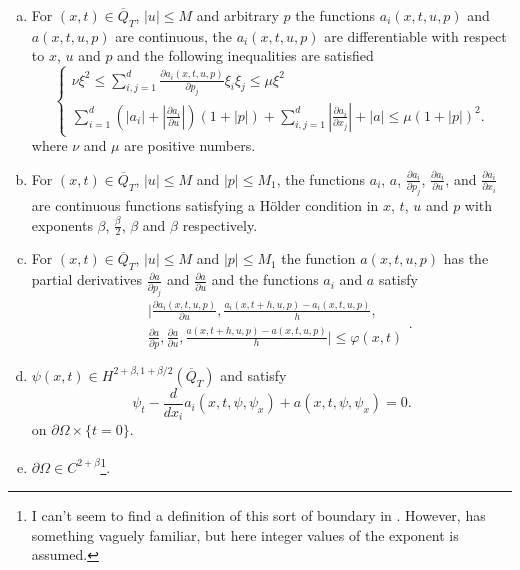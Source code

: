 \documentclass[11pt, a4paper]{article}
\begin{document}
\begin{appendices}
\begin{theorem}
\begin{enumerate}[a)]
	\item For $(x,t) \in \overline{Q}_T$, $|u| \leq M$ and arbitrary $p$ the functions $a_i(x,t,u,p)$ and $a(x,t,u,p)$ are continuous, the $a_i(x,t,u,p)$ are differentiable with respect to $x$, $u$ and $p$ and the following inequalities are satisfied
	\begin{equation}
	\label{exist_cond3}
		\begin{cases}
			\nu\xi^2 \leq \sum_{i,j=1}^d\frac{\partial a_i(x,t,u,p)}{\partial p_j}\xi_i \xi_j \leq \mu \xi^2 \\
			\sum_{i=1}^d \left(|a_i| + |\frac{\partial a_i}{\partial u}|\right)(1+|p|) + \sum_{i,j=1}^d |\frac{\partial a_i}{\partial x_j}| + |a| \leq \mu (1 + |p|)^2. 		
		\end{cases}
	\end{equation}
	where $\nu$ and $\mu$ are positive numbers.
	
	\item For $(x,t) \in \overline{Q}_T$, $|u| \leq M$ and $|p| \leq M_1$, the functions $a_i$, $a$, $\frac{\partial a_i}{\partial p_j}$, $\frac{\partial a_i}{\partial u}$, and $\frac{\partial a_i}{\partial x_i}$ are continuous functions satisfying a Hölder condition in $x$, $t$, $u$ and $p$ with exponents $\beta$, $\frac{\beta}{2}$, $\beta$ and $\beta$ respectively.
	
	\item For $(x,t) \in \overline{Q}_T$, $|u| \leq M$ and $|p| \leq M_1$ the function $a(x,t,u,p)$ has the partial derivatives $\frac{\partial a}{\partial p_j}$ and $\frac{\partial a}{\partial u}$ and the functions $a_i$ and $a$ satisfy
	\begin{equation}
	\label{exist_cond4}
	\begin{split}
		&\Bigg| \frac{\partial a_i(x,t,u,p)}{\partial u}, \frac{a_i(x,t+h,u,p) - 		a_i(x,t,u,p)}{h}, \\
		&\frac{\partial a}{\partial p}, \frac{\partial a}{\partial u}, \frac{a(x,t+h,u,p) - a(x,t,u,p)}{h} \Bigg| \leq \varphi(x,t)
	\end{split}.
	\end{equation}
	
	\item $\psi(x,t) \in H^{2+\beta, 1+\beta/2}(\overline{Q}_T)$ and satisfy
	\begin{equation}
	\label{exist_cond5}
	\psi_t - \frac{d}{dx_i}a_i(x,t,\psi,\psi_x) + a(x,t,\psi,\psi_x) = 0.
	\end{equation}
	on $\partial \Omega \times \{t=0\}$.
	
	\item $\partial \Omega \in C^{2+\beta}$\footnote{I can't seem to find a definition of this sort of boundary in \citep{ladyzhenskaya}. However, \citep{evans} has something vaguely familiar, but here integer values of the exponent is assumed.}.
\end{enumerate}


\end{theorem}
\end{appendices}
\end{document}
